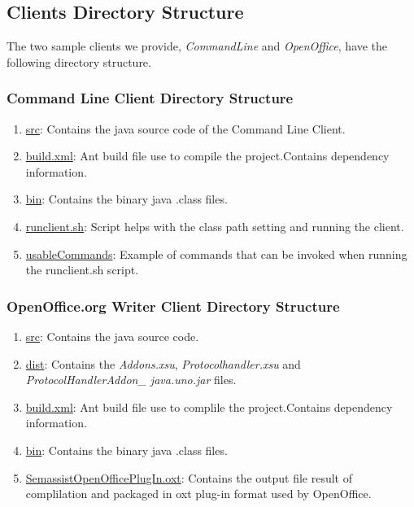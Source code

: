 \subsection{Clients Directory Structure}
The two sample clients we provide, \emph{CommandLine} and \emph{OpenOffice}, have the following directory structure.

\subsubsection{Command Line Client Directory Structure}
\begin{enumerate}
\item \url{src}: Contains the java source code of the Command Line Client.
\item \url{build.xml}: Ant build file use to compile the project.Contains dependency information.
\item \url{bin}: Contains the binary java .class files.
\item \url{runclient.sh}: Script helps with the class path setting and running the client.
\item \url{usableCommands}: Example of commands that can be invoked when running the runclient.sh script.
\end{enumerate}

\subsubsection{OpenOffice.org Writer Client Directory Structure}
\begin{enumerate}
\item \url{src}: Contains the java source code.
\item \url{dist}: Contains the \emph{Addons.xsu}, \emph{Protocolhandler.xsu} and \emph{ProtocolHandlerAddon\_ java.uno.jar} files.
\item \url{build.xml}: Ant build file use to complile the project.Contains dependency information.
\item \url{bin}: Contains the binary java .class files.
\item \url{SemassistOpenOfficePlugIn.oxt}: Contains the output file result of complilation and packaged in oxt plug-in format used by OpenOffice.
\end{enumerate}

